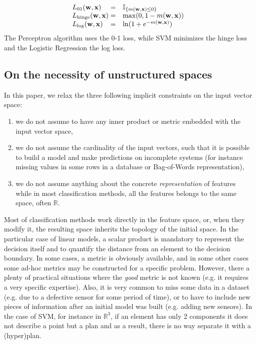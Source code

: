 \documentclass[preprint,12pt]{elsarticle}
\theoremstyle{definition}
\begin{document}
\begin{align}
  \begin{matrix}
    L_{01}(\mathbf{w}, \mathbf{x})\hfill  = & \mathbb{I}_{\{ m(\mathbf{w}, \mathbf{x}) \leq 0 \}} \hfill \\
    L_{\text{hinge}}(\mathbf{w}, \mathbf{x})\hfill  = & \max(0, 1 - m(\mathbf{w}, \mathbf{x})) \\
    L_{\log}(\mathbf{w}, \mathbf{x})\hfill  = & \ln(1 + e^{- m(\mathbf{w}, \mathbf{x})}) \hfill
  \end{matrix}
\end{align}
The Perceptron algorithm uses the 0-1 loss, while SVM minimizes the hinge loss and the Logistic Regression the log loss.


\subsection{On the necessity of unstructured spaces}
\label{sec:bc_unstructured}

In this paper, we relax the three following implicit constraints on the input vector space:
\begin{enumerate}
\item we do not assume to have any inner product or metric embedded with the input vector space,
\item we do not assume the cardinality of the input vectors, such that it is possible to build a model and make predictions on incomplete systems (for instance missing values in some rows in a database or Bag-of-Words representation),
\item we do not assume anything about the concrete {\it representation} of features while in most classification methods, all the features belongs to the same space, often $\mathbb{R}$.
\end{enumerate}
Most of classification methods work directly in the feature space, or, when they modify it, the resulting space inherits the topology of the initial space. In the particular case of linear models, a scalar product is mandatory to represent the decision itself and to quantify the distance from an element to the decision boundary. In some cases, a metric is obviously available, and in some other cases some ad-hoc metrics may be constructed for a specific problem. However, there a plenty of practical situations where the {\it good} metric is not known (e.g. it requires a very specific expertise). Also, it is very common to miss some data in a dataset (e.g. due to a defective sensor for some period of time), or to have to include new pieces of information after an initial model was built (e.g. adding new sensors). In the case of SVM, for instance in $\mathbb{R}^3$, if an element has only 2 components it does not describe a point but a plan and as a result, there is no way separate it with a (hyper)plan. 
\end{document}
